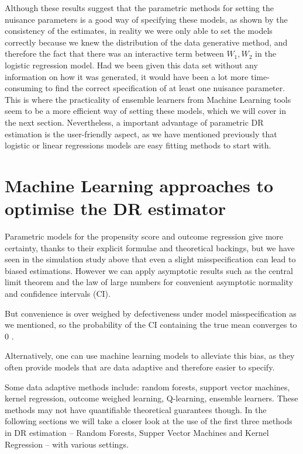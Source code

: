 \documentclass[12pt,twoside]{article}
\begin{document}
Although these results suggest that the parametric methods for setting the nuisance parameters is a good way of specifying these models, as shown by the consistency of the estimates, in reality we were only able to set the models correctly because we knew the distribution of the data generative method, and therefore the fact that there was an interactive term between $W_1,W_2$ in the logistic regression model. Had we been given this data set without any information on how it was generated, it would have been a lot more time-consuming to find the correct specification of at least one nuisance parameter. This is where the practicality of ensemble learners from Machine Learning tools seem to be a more efficient way of setting these models, which we will cover in the next section. Nevertheless, a important advantage of parametric DR estimation is the user-friendly aspect, as we have mentioned previously that logistic or linear regressions models are easy fitting methods to start with.

\section{Machine Learning approaches to optimise the DR estimator}

Parametric models for the propensity score and outcome regression give more certainty, thanks to their explicit formulae and theoretical backings, but we have seen in the simulation study above that even a slight misspecification can lead to biased estimations. However we can apply asymptotic results such as the central limit theorem and the law of large numbers for convenient asymptotic normality and confidence intervals (CI).

But convenience is over weighed by defectiveness under model misspecification as we mentioned, so the probability of the CI containing the true mean converges to 0 \citep{diaz}.

Alternatively, one can use machine learning models to alleviate this bias, as they often provide models that are data adaptive and therefore easier to specify.

Some data adaptive methods include: random forests, support vector machines, kernel regression, outcome weighed learning, Q-learning, ensemble learners. These methods may not have quantifiable theoretical guarantees though. In the following sections we will take a closer look at the use of the first three methods in DR estimation -- Random Forests, Supper Vector Machines and Kernel Regression -- with various settings.
\end{document}

